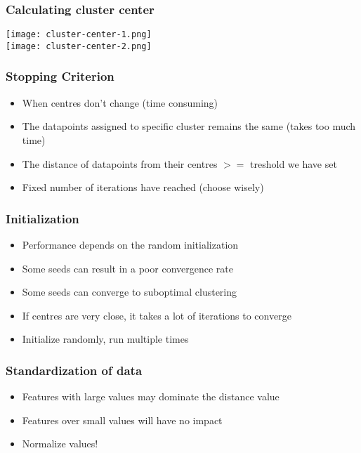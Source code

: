 \subsubsection{Calculating cluster center}
\texttt{[image: cluster-center-1.png]}\\
\texttt{[image: cluster-center-2.png]}

\subsubsection{Stopping Criterion}
\begin{itemize}
    \item When centres don't change (time consuming)
    \item The datapoints assigned to specific cluster remains the same (takes too much time)
    \item The distance of datapoints from their centres $>=$ treshold we have set
    \item Fixed number of iterations have reached (choose wisely)
\end{itemize}

\subsubsection{Initialization}
\begin{itemize}
    \item Performance depends on the random initialization
    \item Some seeds can result in a poor convergence rate
    \item Some seeds can converge to suboptimal clustering
    \item If centres are very close, it takes a lot of iterations to converge
    \item Initialize randomly, run multiple times
\end{itemize}

\subsubsection{Standardization of data}
\begin{itemize}
    \item Features with large values may dominate the distance value
    \item Features over small values will have no impact
    \item Normalize values!
\end{itemize}

